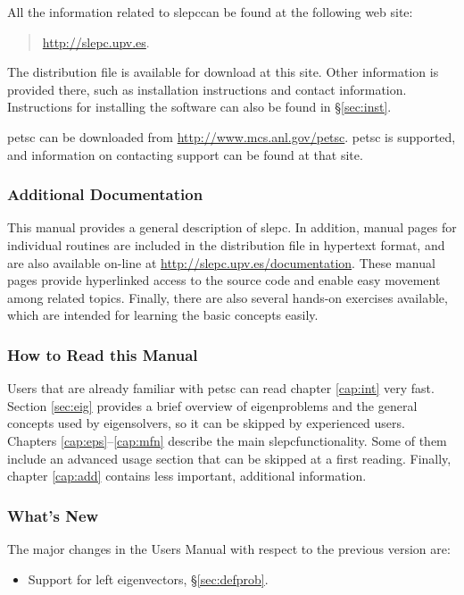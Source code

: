 \documentclass[titlepage,10pt,a4paper]{book}
\newcommand{\slepchome}{http://slepc.upv.es}
\newcommand{\packnoi}[1]{{\sc #1}\xspace}
\newcommand{\slepc}{\texorpdfstring{\packnoi{slep\rm c}}{{SLEPc}}}
\begin{document}
{	All the information related to \slepc can be found at the following web site:
	\begin{quote}
	\begin{center}
	\url{\slepchome}.
	\end{center}
	\end{quote}
	The distribution file is available for download at this site. Other information is provided there, such as installation instructions and contact information. Instructions for installing the software can also be found in \S\ref{sec:inst}.

	\packnoi{pets\rm c} can be downloaded from \url{http://www.mcs.anl.gov/petsc}.  \packnoi{pets\rm c} is supported, and information on contacting support can be found at that site.

\subsubsection*{Additional Documentation}

	This manual provides a general description of \slepc. In addition, manual pages for individual routines are included in the distribution file in hypertext format, and are also available on-line at \url{\slepchome/documentation}. These manual pages provide hyperlinked access to the source code and enable easy movement among related topics. Finally, there are also several hands-on exercises available, which are intended for learning the basic concepts easily.

\subsubsection*{How to Read this Manual}

	Users that are already familiar with \packnoi{pets\rm c} can read chapter \ref{cap:int} very fast. Section \ref{sec:eig} provides a brief overview of eigenproblems and the general concepts used by eigensolvers, so it can be skipped by experienced users. Chapters \ref{cap:eps}--\ref{cap:mfn} describe the main \slepc functionality. Some of them include an advanced usage section that can be skipped at a first reading. Finally, chapter \ref{cap:add} contains less important, additional information.

\subsubsection*{What's New}

The major changes in the Users Manual with respect to the previous version are:
\begin{itemize}
\setlength{\itemsep}{-2pt}
\item Support for left eigenvectors, \S\ref{sec:defprob}.
\end{itemize}

}
\end{document}
